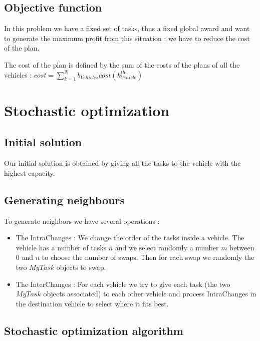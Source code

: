\documentclass[11pt]{article}
\begin{document}
\subsection{Objective function}

In this problem we have a fixed set of tasks, thus a fixed global award and want to generate the maximum profit from this situation : we have to reduce the cost of the plan.

The cost of the plan is defined by the sum of the costs of the plans of all the vehicles : $cost = \sum\limits_{k=1}^Nb_{Vehicles} cost(k^{th}_{Vehicle}) $


\section{Stochastic optimization}

\subsection{Initial solution}

Our initial solution is obtained by giving all the tasks to the vehicle with the highest capacity.

\subsection{Generating neighbours}
To generate neighbors we have several operations :
\begin{itemize}
    \item The IntraChanges : We change the order of the tasks inside a vehicle. The vehicle has a number of tasks $n$ and we select randomly a number $m$ between $0$ and $n$ to choose the number of swaps. Then for each swap we randomly the two $MyTask$ objects to swap.
    \item The InterChanges : For each vehicle we try to give each task (the two $MyTask$ objects associated) to each other vehicle and process IntraChanges in the destination vehicle to select where it fits best.
\end{itemize}

\subsection{Stochastic optimization algorithm}
\end{document}

